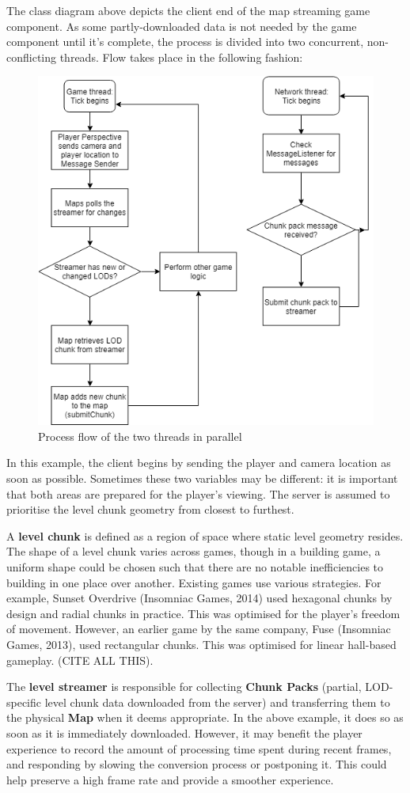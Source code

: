 \documentclass{scrartcl}
\begin{document}
The class diagram above depicts the client end of the map streaming game component. As some partly-downloaded data is not needed by the game component until it's complete, the process is divided into two concurrent, non-conflicting threads. Flow takes place in the following fashion:

\begin{figure}[H]
	\includegraphics[width=0.7\linewidth]{Basic_Flowchart.png}
	\caption{Process flow of the two threads in parallel}
	\label{fig:simpleflow}
\end{figure}

In this example, the client begins by sending the player and camera location as soon as possible. Sometimes these two variables may be different: it is important that both areas are prepared for the player's viewing. The server is assumed to prioritise the level chunk geometry from closest to furthest.

A \textbf{level chunk} is defined as a region of space where static level geometry resides. The shape of a level chunk varies across games, though in a building game, a uniform shape could be chosen such that there are no notable inefficiencies to building in one place over another. Existing games use various strategies. For example, Sunset Overdrive (Insomniac Games, 2014) used hexagonal chunks by design and radial chunks in practice. This was optimised for the player's freedom of movement. However, an earlier game by the same company, Fuse (Insomniac Games, 2013), used rectangular chunks. This was optimised for linear hall-based gameplay. (CITE ALL THIS).

The \textbf{level streamer} is responsible for collecting \textbf{Chunk Packs} (partial, LOD-specific level chunk data downloaded from the server) and transferring them to the physical \textbf{Map} when it deems appropriate. In the above example, it does so as soon as it is immediately downloaded. However, it may benefit the player experience to record the amount of processing time spent during recent frames, and responding by slowing the conversion process or postponing it. This could help preserve a high frame rate and provide a smoother experience.
\end{document}
